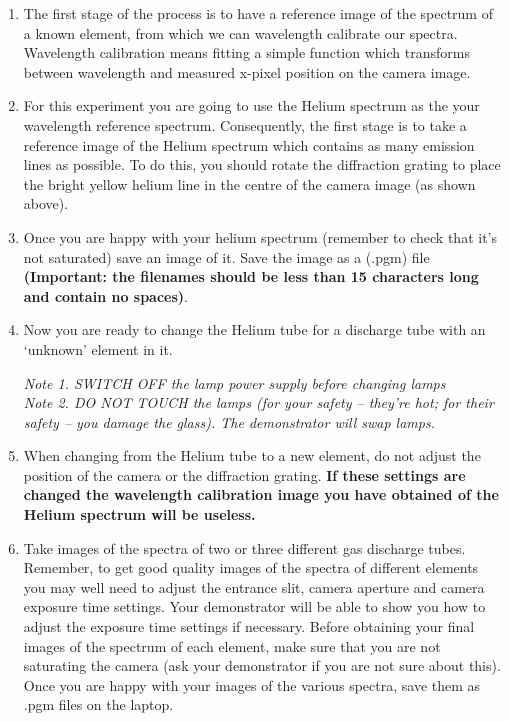 \documentclass[12pt]{article}
\begin{document}
\begin{enumerate}

\item The first stage of the process is to have a reference image of the spectrum of a known element, from which we can wavelength calibrate our spectra. Wavelength calibration means fitting a simple function which transforms between wavelength and measured x-pixel position on the camera image.

\item For this experiment you are going to use the Helium spectrum as the your wavelength reference spectrum. Consequently, the first stage is to take a reference image of the Helium spectrum which contains as many emission lines as possible. To do this, you should rotate the diffraction grating to place the bright yellow helium line in the centre of the camera image (as shown above).

\item Once you are happy with your helium spectrum (remember to check that it's not saturated) save an image of it. Save the image as a (.pgm) file {\bf(Important: the filenames should be less than 15 characters long and contain no spaces)}.

\item Now you are ready to change the Helium tube for a discharge tube with an `unknown' element in it.

{\sl Note 1. SWITCH OFF the lamp power supply before changing lamps}\\
{\sl Note 2. DO NOT TOUCH the lamps (for your safety -- they're hot; for their safety -- you damage the glass). The demonstrator will swap lamps.}

\item When changing from the Helium tube to a new element, do not adjust the position of the camera or the diffraction grating. {\bf If these settings are changed the wavelength calibration image you have obtained of the Helium spectrum will be useless.}

\item Take images of the spectra of two or three different gas discharge tubes. Remember, to get good quality images of the spectra of different elements you may well need to adjust the entrance slit, camera aperture and camera exposure time settings. Your demonstrator will be able to show you how to adjust the exposure time settings if necessary. Before obtaining your final images of the spectrum of each element, make sure that you are not saturating the camera (ask your demonstrator if you are not sure about this). Once you are happy with your images of the various spectra, save them as .pgm files on the laptop.

\end{enumerate}
\end{document}
